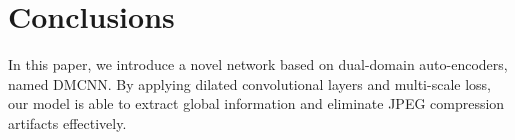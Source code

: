 \documentclass{article}
\begin{document}
\vspace{-0.3cm}
\section{Conclusions}
\vspace{-0.3cm}
\label{sec:conc}
In this paper, we introduce a novel network based on dual-domain auto-encoders,
named DMCNN. By applying dilated convolutional layers and multi-scale loss,
our model is able to extract global information and eliminate
JPEG compression artifacts effectively.










\small

\end{document}
